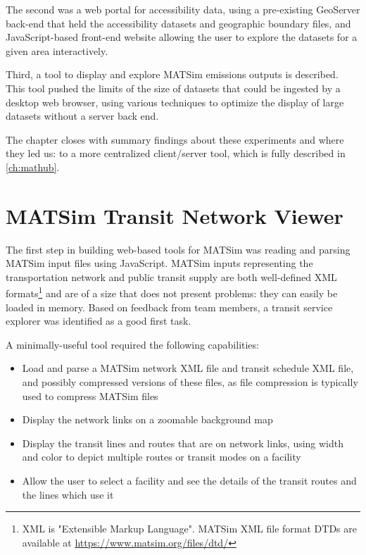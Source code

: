 The second was a web portal for accessibility data, using a pre-existing \gls{GeoServer} back-end that held the accessibility datasets and geographic boundary files, and JavaScript-based front-end website allowing the user to explore the datasets for a given area interactively.

Third, a tool to display and explore MATSim emissions outputs is described. This tool pushed the limits of the size of datasets that could be ingested by a desktop web browser, using various techniques to optimize the display of large datasets without a server back end.

The chapter closes with summary findings about these experiments and where they led us: to a more centralized client/server tool, which is fully described in \autoref{ch:mathub}.

\hypertarget{server-experiments-transit}{%
\section{MATSim Transit Network Viewer}\label{server-experiments-transit}}

The first step in building web-based tools for MATSim was reading and parsing MATSim input files using JavaScript. MATSim inputs representing the transportation network and public transit supply are both well-defined XML formats\footnote{XML is "Extensible Markup Language". MATSim XML file format DTDs are available at \url{https://www.matsim.org/files/dtd/}} and are of a size that does not present problems: they can easily be loaded in memory. Based on feedback from team members, a transit service explorer was identified as a good first task.

A minimally-useful tool required the following capabilities:

\begin{itemize}
  \tightlist
  \item
    Load and parse a MATSim network XML file and transit schedule XML file, and possibly compressed versions of these files, as file compression is typically used to compress MATSim files
  \item
    Display the network links on a zoomable background map
  \item
    Display the transit lines and routes that are on network links, using width and color to depict multiple routes or transit modes on a facility
  \item
    Allow the user to select a facility and see the details of the transit routes and the lines which use it
\end{itemize}

